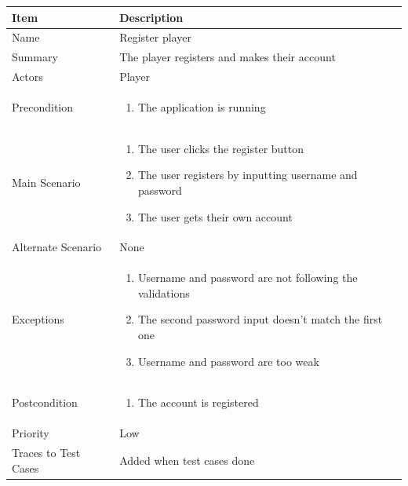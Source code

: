\documentclass[12pt]{article}
\begin{document}
\begin{center}
\setlength{\tabcolsep}{18pt}
\renewcommand{\arraystretch}{1.3}
\begin{tabular}{ |p{3.4cm}|p{10cm}| }
    \hline
    
\textbf{Item} & \textbf{Description} \\
    \hline
    Name & Register player \\
    \hline
    Summary & The player registers and makes their account \\
    \hline
    Actors & Player \\
    \hline
    Precondition & 
    \vspace*{-0.1in}
    \begin{enumerate}
        \item The application is running
    \end{enumerate}  \\
    \hline
    Main Scenario &     
    \vspace*{-0.1in}
    \begin{enumerate}
        \item The user clicks the register button
        \item The user registers by inputting username and password
        \item The user gets their own account
    \end{enumerate}  \\
    \hline
    Alternate Scenario & None \\
    \hline
    Exceptions & 
    \vspace*{-0.1in}
    \begin{enumerate}
        \item Username and password are not following the validations
        \item The second password input doesn't match the first one
        \item Username and password are too weak
    \end{enumerate}  \\
    \hline
    Postcondition &
    \vspace*{-0.1in}
    \begin{enumerate}
        \item The account is registered
    \end{enumerate}  \\
    \hline
    Priority & Low \\
    \hline
    Traces to Test Cases & Added when test cases done  \\
    \hline
\end{tabular}
\end{center}
\end{document}
